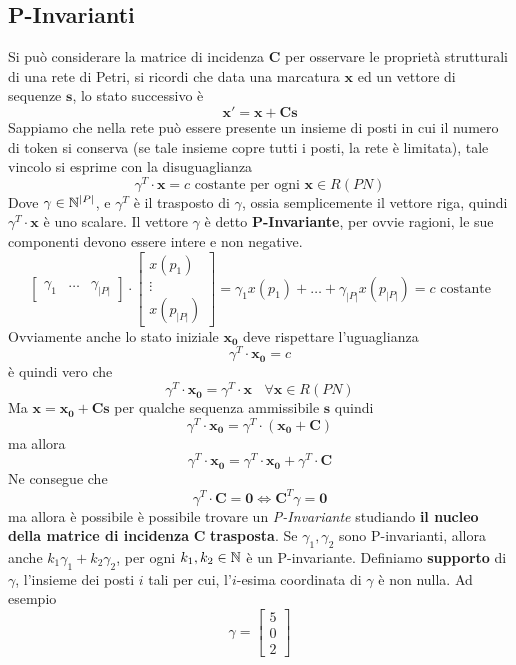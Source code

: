 \documentclass[10pt, letterpaper]{report}
\begin{document}
\subsection{P-Invarianti}
Si può considerare la matrice di incidenza $\mathbf C$ per osservare le proprietà strutturali di una rete di Petri, si ricordi che data una marcatura $\mathbf x$ ed un vettore di sequenze $\mathbf s$, lo stato successivo è 
$$ \mathbf x' = \mathbf x + \mathbf C \mathbf s$$
Sappiamo che nella rete può essere presente un insieme di posti in cui il numero di token si conserva (se tale insieme copre tutti i posti, la rete è limitata), tale vincolo si esprime con la disuguaglianza 
$$ \gamma^T\cdot\mathbf x = c  \text{ costante per ogni }\mathbf x \in R(PN)$$
Dove $\gamma\in {\mathbb N}^{|P|}$,  e $\gamma^T$ è il trasposto di $\gamma$, ossia semplicemente il vettore riga, quindi $\gamma^T\cdot\mathbf x$ è uno scalare. Il vettore $\gamma$ è detto \textbf{P-Invariante}, per ovvie ragioni, le sue componenti devono essere intere e non negative.
$$ \begin{bmatrix}
    \gamma_1& 
    \dots &
    \gamma_{|P|}
\end{bmatrix}\cdot 
\begin{bmatrix}
    x(p_1)\\ 
    \vdots \\ 
    x(p_{|P|})
\end{bmatrix}=\gamma_1x(p_1)+\dots + \gamma_{|P|}  x(p_{|P|})=c \text{ costante}$$
Ovviamente anche lo stato iniziale $\mathbf{x_0}$ deve rispettare l'uguaglianza 
$$\gamma^T\cdot\mathbf{x_0} = c$$
è quindi vero che 
$$\gamma^T\cdot\mathbf{x_0} =\gamma^T\cdot\mathbf{x} \ \ \ \ \forall \mathbf x\in R(PN)$$
Ma $\mathbf x = \mathbf{x_0}+ \mathbf C \mathbf s$ per qualche sequenza ammissibile $\mathbf s$ quindi 
$$\gamma^T\cdot\mathbf{x_0} =\gamma^T\cdot(\mathbf{x_0}+ \mathbf C)$$
ma allora 
$$\gamma^T\cdot\mathbf{x_0} =\gamma^T\cdot\mathbf{x_0}+\gamma^T\cdot\mathbf C $$
Ne consegue che 
$$ \gamma^T\cdot\mathbf C = \mathbf 0\iff \mathbf C^T\gamma=\mathbf 0$$
ma allora è possibile è possibile trovare un \textit{P-Invariante} studiando \textbf{il nucleo della matrice di incidenza} $\mathbf C$ \textbf{trasposta}.
\acc 
Se $\gamma_1,\gamma_2$ sono P-invarianti, allora anche $k_1\gamma_1+k_2\gamma_2$, per ogni $k_1,k_2\in {\mathbb N}$ è un P-invariante. Definiamo \textbf{supporto} di $\gamma$, l'insieme dei posti $i$ tali per cui, l'$i$-esima coordinata di $\gamma$ è non nulla. Ad esempio 
$$ \gamma=\begin{bmatrix}
    5 \\ 0 \\ 2 
\end{bmatrix}$$
\end{document}
